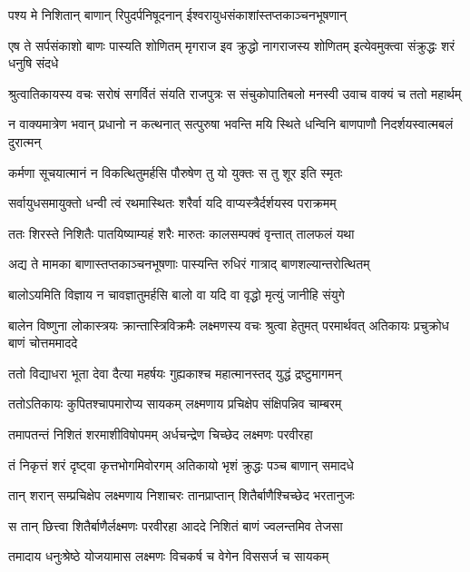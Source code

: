 \twolineshloka
{पश्य मे निशितान् बाणान् रिपुदर्पनिषूदनान्}
{ईश्वरायुधसंकाशांस्तप्तकाञ्चनभूषणान्} %

\threelineshloka
{एष ते सर्पसंकाशो बाणः पास्यति शोणितम्}
{मृगराज इव क्रुद्धो नागराजस्य शोणितम्}
{इत्येवमुक्त्वा संक्रुद्धः शरं धनुषि संदधे} %

\twolineshloka
{श्रुत्वातिकायस्य वचः सरोषं सगर्वितं संयति राजपुत्रः}
{स संचुकोपातिबलो मनस्वी उवाच वाक्यं च ततो महार्थम्} %

\twolineshloka
{न वाक्यमात्रेण भवान् प्रधानो न कत्थनात् सत्पुरुषा भवन्ति}
{मयि स्थिते धन्विनि बाणपाणौ निदर्शयस्वात्मबलं दुरात्मन्} %

\twolineshloka
{कर्मणा सूचयात्मानं न विकत्थितुमर्हसि}
{पौरुषेण तु यो युक्तः स तु शूर इति स्मृतः} %

\twolineshloka
{सर्वायुधसमायुक्तो धन्वी त्वं रथमास्थितः}
{शरैर्वा यदि वाप्यस्त्रैर्दर्शयस्व पराक्रमम्} %

\twolineshloka
{ततः शिरस्ते निशितैः पातयिष्याम्यहं शरैः}
{मारुतः कालसम्पक्वं वृन्तात् तालफलं यथा} %

\twolineshloka
{अद्य ते मामका बाणास्तप्तकाञ्चनभूषणाः}
{पास्यन्ति रुधिरं गात्राद् बाणशल्यान्तरोत्थितम्} %

\twolineshloka
{बालोऽयमिति विज्ञाय न चावज्ञातुमर्हसि}
{बालो वा यदि वा वृद्धो मृत्युं जानीहि संयुगे} %

\threelineshloka
{बालेन विष्णुना लोकास्त्रयः क्रान्तास्त्रिविक्रमैः}
{लक्ष्मणस्य वचः श्रुत्वा हेतुमत् परमार्थवत्}
{अतिकायः प्रचुक्रोध बाणं चोत्तममाददे} %

\twolineshloka
{ततो विद्याधरा भूता देवा दैत्या महर्षयः}
{गुह्यकाश्च महात्मानस्तद् युद्धं द्रष्टुमागमन्} %

\twolineshloka
{ततोऽतिकायः कुपितश्चापमारोप्य सायकम्}
{लक्ष्मणाय प्रचिक्षेप संक्षिपन्निव चाम्बरम्} %

\twolineshloka
{तमापतन्तं निशितं शरमाशीविषोपमम्}
{अर्धचन्द्रेण चिच्छेद लक्ष्मणः परवीरहा} %

\twolineshloka
{तं निकृत्तं शरं दृष्ट्वा कृत्तभोगमिवोरगम्}
{अतिकायो भृशं क्रुद्धः पञ्च बाणान् समादधे} %

\twolineshloka
{तान् शरान् सम्प्रचिक्षेप लक्ष्मणाय निशाचरः}
{तानप्राप्तान् शितैर्बाणैश्चिच्छेद भरतानुजः} %

\twolineshloka
{स तान् छित्त्वा शितैर्बाणैर्लक्ष्मणः परवीरहा}
{आददे निशितं बाणं ज्वलन्तमिव तेजसा} %

\twolineshloka
{तमादाय धनुःश्रेष्ठे योजयामास लक्ष्मणः}
{विचकर्ष च वेगेन विससर्ज च सायकम्} %

